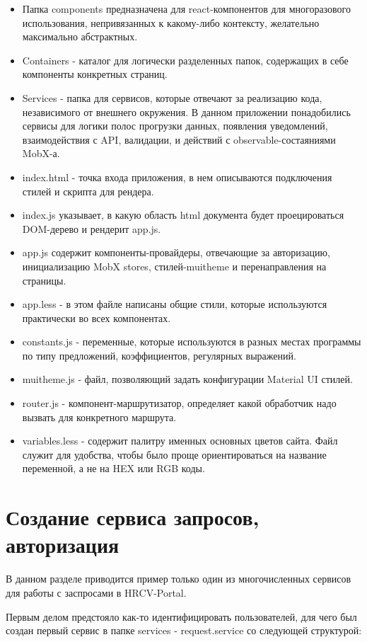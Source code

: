 \documentclass[14pt, a4paper]{diplom}
\begin{document}
\begin{itemize}
\item Папка components предназначена для react-компонентов для многоразового использования, непривязанных к какому-либо контексту, желательно максимально абстрактных.
\item Containers - каталог для логически разделенных папок, содержащих в себе компоненты конкретных страниц.
\item Services - папка для сервисов, которые отвечают за реализацию кода, независимого от внешнего окружения. В данном приложении понадобились сервисы для логики полос прогрузки данных, появления уведомлений, взаимодействия с API, валидации, и действий с observable-состаяниями MobX-а.
\item index.html - точка входа приложения, в нем описываются подключения стилей и скрипта для рендера.
\item index.js указывает, в какую область html документа будет проецироваться DOM-дерево и рендерит app.js.
\item app.js содержит компоненты-провайдеры, отвечающие за авторизацию, инициализацию MobX stores, стилей-muitheme и перенаправления на страницы.
\item app.less - в этом файле написаны общие стили, которые используются практически во всех компонентах.
\item constants.js - переменные, которые используются в разных местах программы по типу предложений, коэффициентов, регулярных выражений.
\item muitheme.js - файл, позволяющий задать конфигурации Material UI стилей.
\item router.js - компонент-маршрутизатор, определяет какой обработчик надо вызвать для конкретного маршрута.
\item variables.less - содержит палитру именных основных цветов сайта. Файл служит для удобства, чтобы было проще ориентироваться на название переменной, а не на HEX или RGB коды.
\end{itemize}

\section{Создание сервиса запросов, авторизация}

В данном разделе приводится пример только один из многочисленных сервисов для работы с заспросами в HRCV-Portal.

Первым делом предстояло как-то идентифицировать пользователей, для чего был создан первый сервис в папке services - request.service со следующей структурой:
\medskip
{}
\medskip
\end{document}

